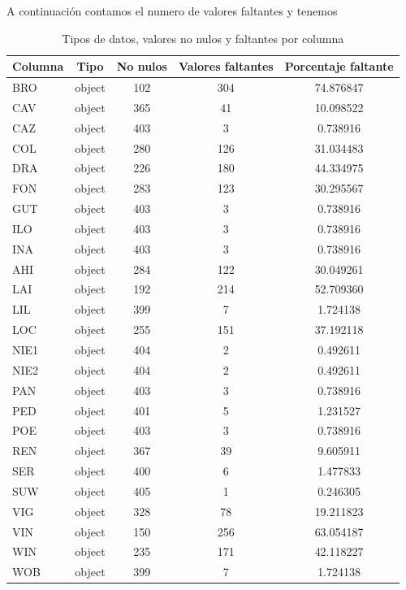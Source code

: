 \documentclass[a4paper,11pt]{article}
\begin{document}
A continuación contamos el numero de valores faltantes y tenemos

\begin{table}
	\centering
	\caption{Tipos de datos, valores no nulos y faltantes por columna}
	\label{tab:info_datos}
	\begin{tabular}{|l|c|c|c|c|}
		\hline
		Columna & Tipo & No nulos & Valores faltantes & Porcentaje faltante \\
		\hline
		BRO & object & 102 & 304 & 74.876847 \\
		CAV  & object & 365 & 41 & 10.098522 \\
		CAZ  & object & 403 & 3 & 0.738916 \\
		COL    & object & 280 & 126 & 31.034483 \\
		DRA  & object & 226 & 180 & 44.334975 \\
		FON  & object & 283 & 123 & 30.295567 \\
		GUT  & object & 403 & 3 & 0.738916 \\
		ILO & object & 403 & 3 & 0.738916 \\
		INA  & object & 403 & 3 & 0.738916 \\
		AHI & object & 284 & 122 & 30.049261 \\
		LAI  & object & 192 & 214 & 52.709360 \\
		LIL & object & 399 & 7 & 1.724138 \\
		LOC  & object & 255 & 151 & 37.192118 \\
		NIE1 & object & 404 & 2 & 0.492611 \\
		NIE2 & object & 404 & 2 & 0.492611 \\
		PAN  & object & 403 & 3 & 0.738916 \\
		PED  & object & 401 & 5 & 1.231527 \\
		POE  & object & 403 & 3 & 0.738916 \\
		REN  & object & 367 & 39 & 9.605911 \\
		SER & object & 400 & 6 & 1.477833 \\
		SUW  & object & 405 & 1 & 0.246305 \\
		VIG  & object & 328 & 78 & 19.211823 \\
		VIN  & object & 150 & 256 & 63.054187 \\
		WIN & object & 235 & 171 & 42.118227 \\
		WOB  & object & 399 & 7 & 1.724138 \\
		\hline
	\end{tabular}
\end{table}
\end{document}
